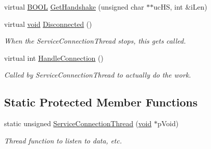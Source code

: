 \begin{DoxyCompactItemize}
virtual \hyperlink{_cpclient_8h_a3be13892ae7076009afcf121347dd319}{\-B\-O\-O\-L} \hyperlink{class_c_connection_socket_a413e9745a663ad7de35320d1fb2b6e91}{\-Get\-Handshake} (unsigned char $\ast$$\ast$uc\-H\-S, int \&i\-Len)
\item 
virtual \hyperlink{_cpclient_8h_a6464f7480a0fd0ee170cba12b2c0497f}{void} \hyperlink{class_c_connection_socket_a2d991ece47fd9c86366af981c70d51fc}{\-Disconnected} ()
\begin{DoxyCompactList}\small\item\em \-When the \-Service\-Connection\-Thread stops, this gets called. \end{DoxyCompactList}\item 
virtual int \hyperlink{class_c_connection_socket_a92a2d68cd4df71591df3bd8320777504}{\-Handle\-Connection} ()
\begin{DoxyCompactList}\small\item\em \-Called by \-Service\-Connection\-Thread to actually do the work. \end{DoxyCompactList}\end{DoxyCompactItemize}
\subsection*{\-Static \-Protected \-Member \-Functions}
\begin{DoxyCompactItemize}
\item 
static unsigned \hyperlink{class_c_connection_socket_add0d86dff0967303cb14c0edb5ef8ffe}{\-Service\-Connection\-Thread} (\hyperlink{_cpclient_8h_a6464f7480a0fd0ee170cba12b2c0497f}{void} $\ast$p\-Void)
\begin{DoxyCompactList}\small\item\em \-Thread function to listen to data, etc. \end{DoxyCompactList}\end{DoxyCompactItemize}
